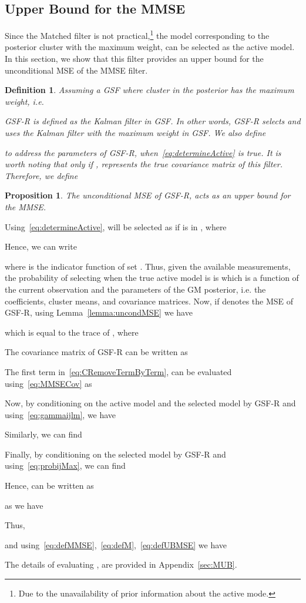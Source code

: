 \documentclass[10pt,twocolumn,twoside]{IEEEtran}
\newtheorem{Def}{Definition}
\newtheorem{Prop}{Proposition}
\newcommand{\corcol}[1]{\textcolor{CorCol}{#1}}
\begin{document}
 
\subsection{Upper Bound for the MMSE}
\label{sec:UB}
Since the Matched filter is not practical,\footnote{Due to the unavailability of prior information about the active mode.} the model corresponding to the posterior cluster with the maximum weight,  can be selected as the active model. In this section, we show that this filter provides an upper bound for the unconditional MSE of the MMSE filter.

\begin{Def}
\label{def:UBFilter}
Assuming a GSF where cluster  in the posterior has the maximum weight, i.e.

GSF-R is defined as the Kalman filter  in GSF. In other words, GSF-R selects and uses the Kalman filter with the maximum weight in GSF. We also define

to address the parameters of GSF-R, when~\eqref{eq:determineActive} is true. \corcol{It is worth noting that only if ,  represents the true covariance matrix of this filter. Therefore, we define}
\corcol{}
\end{Def}

\begin{Prop}
\label{prop:UB}
The unconditional MSE of GSF-R, acts as an upper bound for the MMSE.
\end{Prop}
\begin{IEEEproof}
Using~\eqref{eq:determineActive},  will be selected as  if  is in , where

Hence, we can write

where  is the indicator function of set . Thus, given the available measurements, the probability of selecting  when the true active model is  is
\corcol{
which is a function of the current observation and the parameters of the GM posterior, i.e. the coefficients, cluster means, and covariance matrices.}
Now, if  denotes the MSE of GSF-R, using Lemma~\ref{lemma:uncondMSE} we have

which is equal to the trace of , where

The covariance matrix of GSF-R can be written as
\corcol{
The first term in~\eqref{eq:CRemoveTermByTerm}, can be evaluated using~\eqref{eq:MMSECov} as

Now, by conditioning on the active model and the selected model by GSF-R and using~\eqref{eq:gammaijlm}, we have

Similarly, we can find 

Finally, by conditioning on the selected model by GSF-R and using~\eqref{eq:probijMax}, we can find

Hence,  can be written as

as we have

Thus, 

and using~\eqref{eq:defMMSE},~\eqref{eq:defM},~\eqref{eq:defUBMSE} we have}

\end{IEEEproof}
The details of evaluating , are provided in Appendix~\ref{sec:MUB}.
\end{document}

